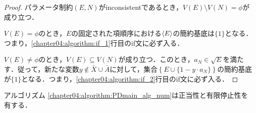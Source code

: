 \begin{proof}
	パラメータ制約$(E, N)$がinconsistentであるとき，$V(E) \setminus V(N) = \phi$が成り立つ．
	\par
	$V(E) = \phi$のとき，$E$の固定された項順序における$\langle E \rangle$の簡約\groebner{}基底は$\{1\}$となる．つまり，\ref{chapter04:algorithm:if_1}行目のif文に必ず入る．
	\par
	$V(E) \ne \phi$のとき，$V(E) \subseteq V(N)$が成り立つ．このとき，$a_N \in \sqrt{E}$を満たす．従って，新たな変数$y \notin \bar{X}\cup \bar{A}$に対して，集合$\left\{E \cup \{1 - y \cdot a_N\}\right\}$の簡約\groebner{}基底が$\{1\}$となる．つまり，\ref{chapter04:algorithm:if_2}行目のif文に必ず入る．

\end{proof}

\begin{theorem}
	アルゴリズム \ref{chapter04:algorithm:PDmain_alg_num}は正当性と有限停止性を有する．
\end{theorem}

